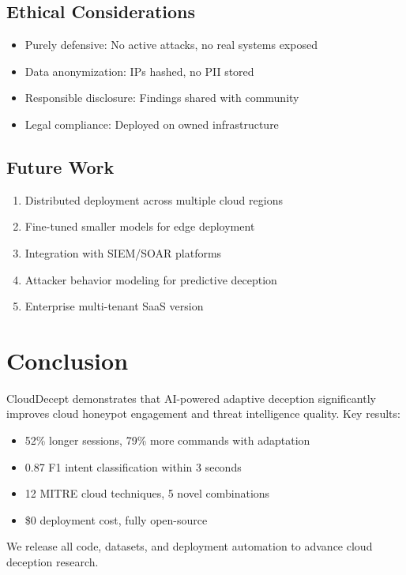 \documentclass[10pt,conference]{IEEEtran}
\begin{document}
\subsection{Ethical Considerations}
\begin{itemize}
    \item Purely defensive: No active attacks, no real systems exposed
    \item Data anonymization: IPs hashed, no PII stored
    \item Responsible disclosure: Findings shared with community
    \item Legal compliance: Deployed on owned infrastructure
\end{itemize}

\subsection{Future Work}
\begin{enumerate}
    \item Distributed deployment across multiple cloud regions
    \item Fine-tuned smaller models for edge deployment
    \item Integration with SIEM/SOAR platforms
    \item Attacker behavior modeling for predictive deception
    \item Enterprise multi-tenant SaaS version
\end{enumerate}

\section{Conclusion}
\label{sec:conclusion}

CloudDecept demonstrates that AI-powered adaptive deception significantly improves
cloud honeypot engagement and threat intelligence quality. Key results:
\begin{itemize}
    \item 52\% longer sessions, 79\% more commands with adaptation
    \item 0.87 F1 intent classification within 3 seconds
    \item 12 MITRE cloud techniques, 5 novel combinations
    \item \$0 deployment cost, fully open-source
\end{itemize}

We release all code, datasets, and deployment automation to advance cloud deception research.



\end{document}
